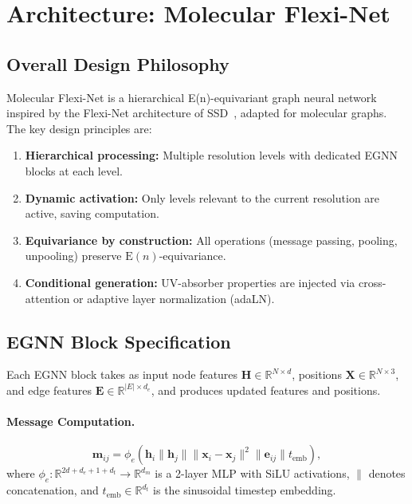 \documentclass[12pt,a4paper]{article}
\providecommand{\R}{}
\renewcommand{\R}{\mathbb{R}}
\newcommand{\bx}{\bm{x}}
\newcommand{\bh}{\bm{h}}
\begin{document}
\section{Architecture: Molecular Flexi-Net}\label{sec:architecture}

\subsection{Overall Design Philosophy}

Molecular Flexi-Net is a hierarchical E(n)-equivariant graph neural network inspired by the Flexi-Net architecture of SSD~\cite{ssd2026}, adapted for molecular graphs. The key design principles are:

\begin{enumerate}
    \item \textbf{Hierarchical processing:} Multiple resolution levels with dedicated EGNN blocks at each level.
    \item \textbf{Dynamic activation:} Only levels relevant to the current resolution are active, saving computation.
    \item \textbf{Equivariance by construction:} All operations (message passing, pooling, unpooling) preserve $\mathrm{E}(n)$-equivariance.
    \item \textbf{Conditional generation:} UV-absorber properties are injected via cross-attention or adaptive layer normalization (adaLN).
\end{enumerate}

\subsection{EGNN Block Specification}\label{sec:egnn_block}

Each EGNN block takes as input node features $\bm{H} \in \R^{N \times d}$, positions $\bm{X} \in \R^{N \times 3}$, and edge features $\bm{E} \in \R^{|E| \times d_e}$, and produces updated features and positions.

\paragraph{Message Computation.}
\begin{equation}\label{eq:arch_message}
    \bm{m}_{ij} = \phi_e\!\left(\bh_i \| \bh_j \| \|\bx_i - \bx_j\|^2 \| \bm{e}_{ij} \| t_{\mathrm{emb}}\right),
\end{equation}
where $\phi_e: \R^{2d + d_e + 1 + d_t} \to \R^{d_m}$ is a 2-layer MLP with SiLU activations, $\|$ denotes concatenation, and $t_{\mathrm{emb}} \in \R^{d_t}$ is the sinusoidal timestep embedding.
\end{document}
